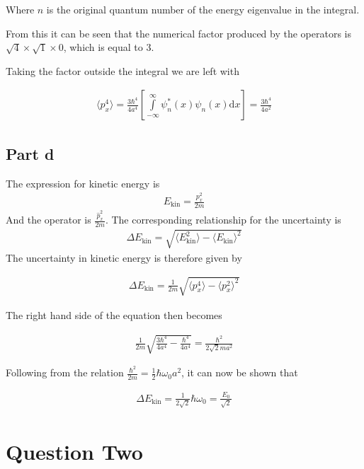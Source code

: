 \documentclass[paper=a4, fontsize=11pt]{scrartcl} %
\numberwithin{equation}{section} %
\numberwithin{figure}{section} %
\numberwithin{table}{section} %
\begin{document}
Where $n$ is the original quantum number of the energy eigenvalue in the integral.


From this it can be seen that the numerical factor produced by the operators is $\sqrt{4} \times \sqrt{1} \times 0$, which is equal to $3$.

Taking the factor outside the integral we are left with

\begin{align}
\langle p^4_x \rangle = \frac{3\hbar^4}{4a^4}
\left[\int\limits_{-\infty}^{\infty}\psi^*_n\left(x\right) \psi_n\left(x\right) \mathrm{d}x \right] = \frac{3\hbar^4}{4a^2}
\end{align}

\subsection{Part d}
The expression for kinetic energy is
\begin{align}
E_{\textrm{kin}} = \frac{p^2_x}{2m}
\end{align}
And the operator is $\frac{\hat{p}^2_x}{2m}$. The corresponding relationship for the uncertainty is
\begin{align}
\Delta E_{\textrm{kin}} = \sqrt{\langle E_{\textrm{kin}}^2\rangle - \langle E_{\textrm{kin}}\rangle^2}
\end{align}
The uncertainty in kinetic energy is therefore given by

\begin{align}
\Delta E_{\textrm{kin}} = \frac{1}{2m}\sqrt{\langle p^4_x \rangle - \langle p^2_x \rangle^2}
\end{align}

The right hand side of the equation then becomes

\begin{align}
\frac{1}{2m} \sqrt{\frac{3\hbar^4}{4a^4} - \frac{\hbar^4}{4a^4}}
= \frac{\hbar^2}{2\sqrt{2}ma^2}
\end{align}

Following from the relation $\frac{\hbar^2}{2m} = \frac{1}{2} \hbar \omega_0 a^2$, it can now be shown that

\begin{align}
\Delta E_{\textrm{kin}} = \frac{1}{2\sqrt{2}}\hbar \omega_0
= \frac{E_0}{\sqrt{2}}
\end{align}

\section{Question Two}
\end{document}
